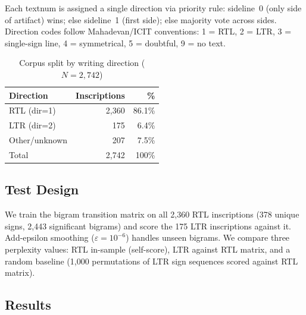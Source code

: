 \documentclass[12pt,letterpaper]{article}
\begin{document}
Each textnum is assigned a single direction via priority rule:
sideline~0 (only side of artifact) wins; else sideline~1 (first
side); else majority vote across sides.
Direction codes follow Mahadevan/ICIT conventions: 1 = RTL, 2 = LTR,
3 = single-sign line, 4 = symmetrical, 5 = doubtful, 9 = no text.

\begin{table}[htbp]
\centering
\caption{Corpus split by writing direction ($N = 2{,}742$)}
\begin{tabular}{lrr}
\toprule
Direction & Inscriptions & \% \\
\midrule
RTL (dir=1) & 2,360 & 86.1\% \\
LTR (dir=2) &   175 &  6.4\% \\
Other/unknown & 207 &  7.5\% \\
\midrule
Total & 2,742 & 100\% \\
\bottomrule
\end{tabular}
\end{table}

\subsection{Test Design}

We train the bigram transition matrix on all 2,360 RTL inscriptions
(378 unique signs, 2,443 significant bigrams) and score the 175 LTR
inscriptions against it.
Add-epsilon smoothing ($\varepsilon = 10^{-6}$) handles unseen bigrams.
We compare three perplexity values: RTL in-sample (self-score),
LTR against RTL matrix, and a random baseline
(1,000 permutations of LTR sign sequences scored against RTL matrix).

\subsection{Results}
\end{document}
